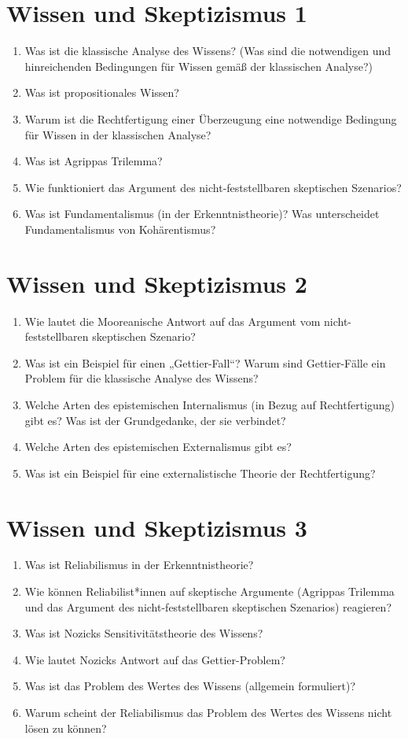 \documentclass[../main.tex]{subfiles}
\begin{document}
\section{Wissen und Skeptizismus 1} 
\begin{enumerate}
	\item Was ist die klassische Analyse des Wissens? (Was sind die notwendigen und hinreichenden Bedingungen für Wissen gemäß der klassischen Analyse?)
	\item Was ist propositionales Wissen?
	\item Warum ist die Rechtfertigung einer Überzeugung eine notwendige Bedingung für Wissen in der klassischen Analyse?
	\item Was ist Agrippas Trilemma?
	\item Wie funktioniert das Argument des nicht-feststellbaren skeptischen Szenarios?
	\item Was ist Fundamentalismus (in der Erkenntnistheorie)? Was unterscheidet Fundamentalismus von Kohärentismus?
\end{enumerate}

\section{Wissen und Skeptizismus 2} 
\begin{enumerate}
	\item Wie lautet die Mooreanische Antwort auf das Argument vom nicht-feststellbaren skeptischen Szenario?
	\item Was ist ein Beispiel für einen „Gettier-Fall“? Warum sind Gettier-Fälle ein Problem für die klassische Analyse des Wissens?
	\item Welche Arten des epistemischen Internalismus (in Bezug auf Rechtfertigung) gibt es? Was ist der Grundgedanke, der sie verbindet?
	\item Welche Arten des epistemischen Externalismus gibt es?
	\item Was ist ein Beispiel für eine externalistische Theorie der Rechtfertigung?
\end{enumerate}

\section{Wissen und Skeptizismus 3} 
\begin{enumerate}
	\item Was ist Reliabilismus in der Erkenntnistheorie?
	\item Wie können Reliabilist*innen auf skeptische Argumente (Agrippas Trilemma und das Argument des nicht-feststellbaren skeptischen Szenarios) reagieren?
	\item Was ist Nozicks Sensitivitätstheorie des Wissens?
	\item Wie lautet Nozicks Antwort auf das Gettier-Problem?
	\item Was ist das Problem des Wertes des Wissens (allgemein formuliert)?
	\item Warum scheint der Reliabilismus das Problem des Wertes des Wissens nicht lösen zu können?
\end{enumerate}
\end{document}
